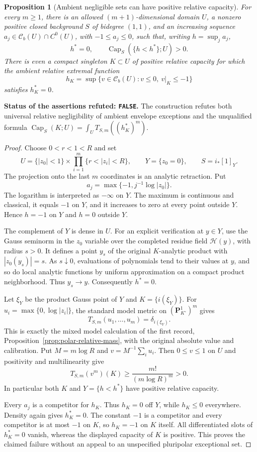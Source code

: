 \documentclass[11pt,a4paper]{article}
\numberwithin{equation}{section}
\newtheorem{proposition}[theorem]{Proposition}
\theoremstyle{definition}
\theoremstyle{remark}
\newcommand{\Cb}{\mathcal C_b}
\begin{document}
\begin{proposition}[Ambient negligible sets can have positive relative capacity]
\label{prop:r2-negligible-positive}
For every $m\geq1$, there is an allowed $(m+1)$-dimensional domain
$U$, a nonzero positive closed background $S$ of bidegree $(1,1)$,
and an increasing sequence $a_j\in\Cb(U)\cap C^0(U)$, with
$-1\leq a_j\leq0$, such that, writing $h=\sup_j a_j$,
\[
 h^*=0,\qquad
 \operatorname{Cap}_{S}(\{h<h^*\};U)>0.
\]
There is even a compact singleton $K\subset U$ of positive relative
capacity for which the ambient relative extremal function
\[
 h_K=\sup\{v\in\Cb(U):v\leq0,\ v|_K\leq-1\}
\]
satisfies $h_K^*=0$.
\end{proposition}

\noindent\textbf{Status of the assertions refuted: \texttt{FALSE}.}
The construction refutes both universal relative negligibility of
ambient envelope exceptions and the unqualified formula
$\operatorname{Cap}_S(K;U)=\int_U T_{S,m}((h_K^*)^m)$.

\begin{proof}
Choose $0<r<1<R$ and set
\[
 U=\{|z_0|<1\}\times\prod_{i=1}^m\{r<|z_i|<R\},
 \qquad Y=\{z_0=0\},\qquad S=i_*[1]_Y.
\]
The projection onto the last $m$ coordinates is an analytic
retraction. Put
\[
 a_j=\max\{-1,j^{-1}\log|z_0|\}.
\]
The logarithm is interpreted as $-\infty$ on $Y$. The maximum is
continuous and classical, it equals $-1$ on $Y$, and it increases
to zero at every point outside $Y$. Hence $h=-1$ on $Y$ and $h=0$
outside $Y$.

The complement of $Y$ is dense in $U$. For an explicit verification
at $y\in Y$, use the Gauss seminorm in the $z_0$ variable over the
completed residue field $\mathcal H(y)$, with radius $s>0$. It defines
a point $y_s$ of the original $K$-analytic product with
$|z_0(y_s)|=s$. As $s\downarrow0$, evaluations of polynomials tend
to their values at $y$, and so do local analytic functions by uniform
approximation on a compact product neighborhood. Thus $y_s\to y$.
Consequently $h^*=0$.

Let $\xi_Y$ be the product Gauss point of $Y$ and $K=\{i(\xi_Y)\}$.
For $u_i=\max\{0,\log|z_i|\}$, the standard model metric on
$(\mathbf P^1_{K^\circ})^m$ gives
\[
 T_{S,m}(u_1,\ldots,u_m)=\delta_{i(\xi_Y)}.
\]
This is exactly the mixed model calculation of the first record,
Proposition~\ref{prop:polar-relative-mass}, with the original
absolute value and calibration. Put $M=m\log R$ and
$v=M^{-1}\sum_i u_i$. Then $0\leq v\leq1$ on $U$ and positivity
and multilinearity give
\[
 T_{S,m}(v^m)(K)\geq \frac{m!}{(m\log R)^m}>0.
\]
In particular both $K$ and $Y=\{h<h^*\}$ have positive relative
capacity.

Every $a_j$ is a competitor for $h_K$. Thus $h_K=0$ off $Y$, while
$h_K\leq0$ everywhere. Density again gives $h_K^*=0$. The constant
$-1$ is a competitor and every competitor is at most $-1$ on $K$,
so $h_K=-1$ on $K$ itself. All differentiated slots of $h_K^*=0$
vanish, whereas the displayed capacity of $K$ is positive. This
proves the claimed failure without an appeal to an unspecified
pluripolar exceptional set.
\end{proof}
\end{document}
